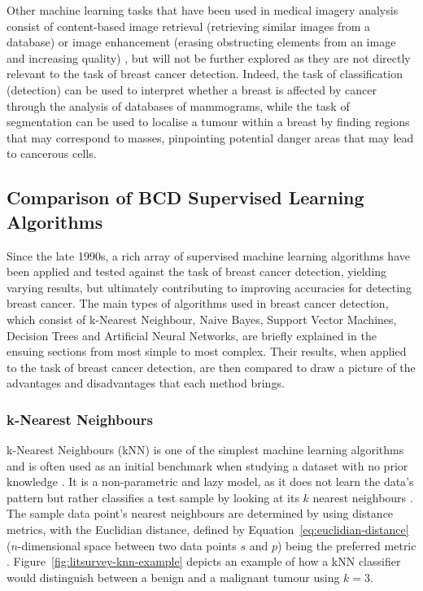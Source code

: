 Other machine learning tasks that have been used in medical imagery analysis consist of content-based image retrieval (retrieving similar images from a database) or image enhancement (erasing obstructing elements from an image and increasing quality) \cite{Litjens2017}, but will not be further explored as they are not directly relevant to the task of breast cancer detection. Indeed, the task of classification (detection) can be used to interpret whether a breast is affected by cancer through the analysis of databases of mammograms, while the task of segmentation can be used to localise a tumour within a breast by finding regions that may correspond to masses, pinpointing potential danger areas that may lead to cancerous cells.

\subsection{Comparison of BCD Supervised Learning Algorithms}

Since the late 1990s, a rich array of supervised machine learning algorithms have been applied and tested against the task of breast cancer detection, yielding varying results, but ultimately contributing to improving accuracies for detecting breast cancer. The main types of algorithms used in breast cancer detection, which consist of k-Nearest Neighbour, Naive Bayes, Support Vector Machines, Decision Trees and Artificial Neural Networks, are briefly explained in the ensuing sections from most simple to most complex. Their results, when applied to the task of breast cancer detection, are then compared to draw a picture of the advantages and disadvantages that each method brings.

\subsubsection{k-Nearest Neighbours}
\label{sec:litreview-knn}

k-Nearest Neighbours (kNN) is one of the simplest machine learning algorithms and is often used as an initial benchmark when studying a dataset with no prior knowledge \cite{peterson2009k}. It is a non-parametric and lazy model, as it does not learn the data's pattern but rather classifies a test sample by looking at its $k$ nearest neighbours \cite{Yue2018}. The sample data point's nearest neighbours are determined by using distance metrics, with the Euclidian distance, defined by Equation~\ref{eq:euclidian-distance} ($n$-dimensional space between two data points $s$ and $p$) being the preferred metric \cite{peterson2009k}. Figure~\ref{fig:litsurvey-knn-example} depicts an example of how a kNN classifier would distinguish between a benign and a malignant tumour using $k=3$.

